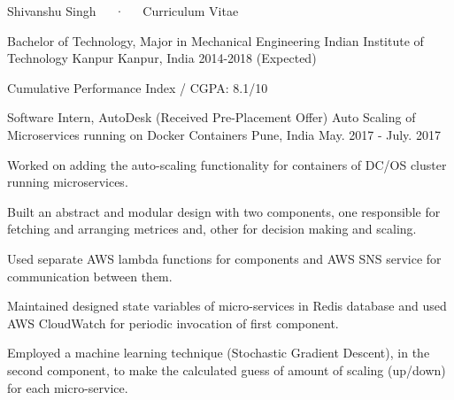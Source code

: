 \documentclass[11pt, a4paper]{cv}
\begin{document}
\makecvheader

\makecvfooter
  {}
  {Shivanshu Singh~~~·~~~Curriculum Vitae}
  {\thepage}


\begin{cventries}

  \cventry
    {Bachelor of Technology, Major in Mechanical Engineering} %
    {Indian Institute of Technology Kanpur} %
    {Kanpur, India} %
        {2014-2018 (Expected)} %
    {
      \begin{cvitems} %
        \item {Cumulative Performance Index / CGPA: 8.1/10}
      \end{cvitems}
    }

\end{cventries}



\begin{cventries}

  \cventry
    {Software Intern, AutoDesk (Received Pre-Placement Offer)} %
    {Auto Scaling of Microservices running on Docker Containers} %
    {Pune, India} %
    {May. 2017 - July. 2017} %
    {
      \begin{cvitems} %
        \item {Worked on adding the auto-scaling functionality for containers of DC/OS cluster running microservices.}
        \item {Built an abstract and modular design with two components, one responsible for fetching and arranging metrices and, other for decision making and scaling.}
        \item {Used separate AWS lambda functions for components and AWS SNS service for communication between them.}
        \item {Maintained designed state variables of micro-services in Redis database and used AWS CloudWatch for periodic invocation of first component.}
        \item {Employed a machine learning technique (Stochastic Gradient Descent), in the second component, to make the calculated guess of amount of scaling (up/down) for each micro-service.}
      \end{cvitems}
    }

\end{cventries}
\end{document}
